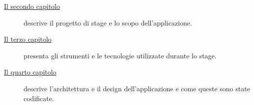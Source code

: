 \begin{description} 
    \item[{\hyperref[cap:descrizione-stage]{Il secondo capitolo}}] descrive il progetto di stage e lo scopo dell'applicazione.
    
    \item[{\hyperref[cap:tecnologie-strumenti]{Il terzo capitolo}}] presenta gli strumenti e le tecnologie utilizzate durante lo stage.
    
    \item[{\hyperref[cap:design]{Il quarto capitolo}}] descrive l'architettura e il design dell'applicazione e come queste sono state codificate.
    
    
\end{description}
